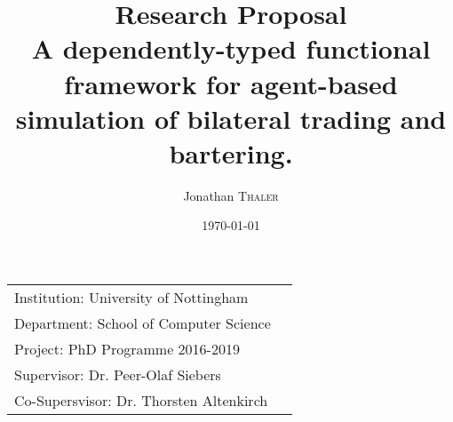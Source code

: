 \documentclass{article}
\title{ {\normalsize Research Proposal} \\ A dependently-typed functional framework for agent-based simulation of bilateral trading and bartering.} %
\author{Jonathan \textsc{Thaler}} %
\date{\today} %
\begin{document}
\maketitle %

\begin{center}
\begin{tabular}{l r}
Institution: University of Nottingham \\
Department: School of Computer Science \\
Project: PhD Programme 2016-2019 \\
Supervisor: Dr. Peer-Olaf Siebers \\
Co-Supersvisor: Dr. Thorsten Altenkirch 
\end{tabular}
\end{center}
\end{document}
